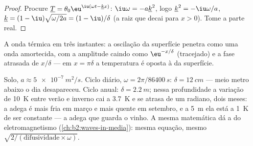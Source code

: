 \begin{proof}
Procure $\underline T = \theta_0\eu^{\iu(\omega t - \underline k x)}$:
$\iu\omega = -a\underline k^2$, logo $\underline k^2 = -\iu\omega/a$,
$\underline k = (1 - \iu)\sqrt{\omega/2a} = (1 - \iu)/\delta$ (a raiz
que decai para $x > 0$). Tome a parte real.
\end{proof}

\begin{omfigure}

{\small A onda térmica em três instantes: a oscilação da superfície
penetra como uma onda amortecida, com a amplitude caindo como $\eu^{-x/\delta}$
(tracejado) e a fase atrasada de $x/\delta$ --- em $x = \pi\delta$ a
temperatura é oposta à da superfície.}
\end{omfigure}

\begin{example}\label{ex:b2:heat-conduction:soil}
Solo, $a \approx \qty{5e-7}{m^2/s}$. Ciclo diário, $\omega = 2\pi/\qty{86400}{s}$:
$\delta = \qty{12}{cm}$ --- meio metro abaixo o dia desapareceu. Ciclo anual:
$\delta = \qty{2.2}{m}$; nessa profundidade a variação de \qty{10}{K} entre verão e inverno
cai a \qty{3.7}{K} e se atrasa de um radiano, dois meses: a adega é
mais fria em março e mais quente em setembro, e a \qty{5}{m} ela está a
\qty{1}{K} de ser constante --- a adega que guarda o vinho. A mesma
matemática dá a  do eletromagnetismo
(\cref{ch:b2:waves-in-media}): mesma equação, mesmo $\sqrt{2/(\text{difusividade}
\times\omega)}$.
\end{example}

